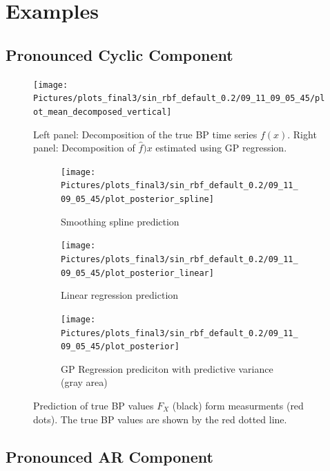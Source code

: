 \section{Examples}


\subsection{Pronounced Cyclic Component}

\begin{figure}[!ht]
\centering
    \texttt{[image: Pictures/plots\_final3/sin\_rbf\_default\_0.2/09\_11\_09\_05\_45/plot\_mean\_decomposed\_vertical]}
\caption[Decomposed BP time sereis]{Left panel: Decomposition of the true BP time series $f(x)$. Right panel:
Decomposition of $\hat{f})x$ estimated using GP regression.}
\label{fig:ex1-gp-prediction}
\end{figure}

\begin{figure}[!ht]
\centering

\begin{subfigure}{.45\textwidth}
    \centering
    \texttt{[image: Pictures/plots\_final3/sin\_rbf\_default\_0.2/09\_11\_09\_05\_45/plot\_posterior\_spline]}
  \caption[Spline]{Smoothing spline prediction}
  \label{fig:ex1-spline}
\end{subfigure}\hfill
\begin{subfigure}{.45\textwidth}
    \centering
    \texttt{[image: Pictures/plots\_final3/sin\_rbf\_default\_0.2/09\_11\_09\_05\_45/plot\_posterior\_linear]}
  \caption[Linear Regression]{Linear regression prediction}
  \label{fig:ex1-linear}
\end{subfigure}
\begin{subfigure}{0.6\textwidth}
    \centering
    \texttt{[image: Pictures/plots\_final3/sin\_rbf\_default\_0.2/09\_11\_09\_05\_45/plot\_posterior]}
  \caption[GP Prediction]{GP Regression prediciton with predictive variance (gray area)}
  \label{fig:ex1-spline}
\end{subfigure}
\caption[True BP value prediction]{Prediction of true BP values $F_X$ (black) form measurments (red dots). The true BP values are shown
by the red dotted line. }
\label{fig:ex1}
\end{figure}


\subsection{Pronounced AR Component}

